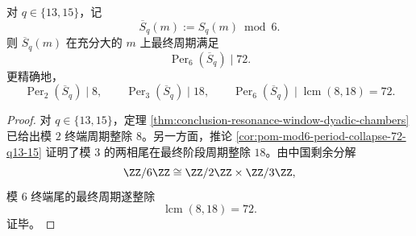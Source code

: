 \begin{theorem}\label{thm:conclusion-resonance-window-q13-q15-mod6-period72}
对 \(q\in\{13,15\}\)，记
\[
\overline S_q(m):=S_q(m)\bmod 6.
\]
则 \(\overline S_q(m)\) 在充分大的 \(m\) 上最终周期满足
\[
\operatorname{Per}_6(\overline S_q)\mid 72.
\]
更精确地，
\[
\operatorname{Per}_2(\overline S_q)\mid 8,
\qquad
\operatorname{Per}_3(\overline S_q)\mid 18,
\qquad
\operatorname{Per}_6(\overline S_q)\mid \operatorname{lcm}(8,18)=72.
\]
\end{theorem}

\begin{proof}
对 \(q\in\{13,15\}\)，定理 \ref{thm:conclusion-resonance-window-dyadic-chambers} 已给出模 \(2\) 终端周期整除 \(8\)。另一方面，推论 \ref{cor:pom-mod6-period-collapse-72-q13-15} 证明了模 \(3\) 的两相尾在最终阶段周期整除 \(18\)。由中国剩余分解
\[
\ZZ/6\ZZ\cong \ZZ/2\ZZ\times \ZZ/3\ZZ,
\]
模 \(6\) 终端尾的最终周期遂整除
\[
\operatorname{lcm}(8,18)=72.
\]
证毕。
\end{proof}

